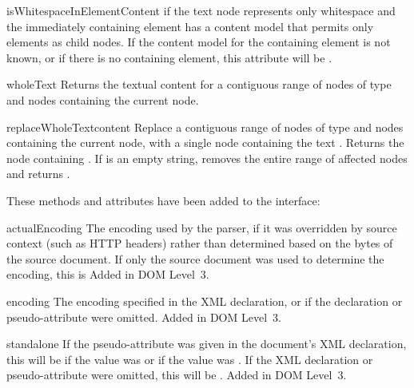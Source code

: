 \documentclass{howto}
\newcommand{\attribute}[1]{\code{#1}}
\begin{document}
\begin{memberdesc}[Text]{isWhitespaceInElementContent}
   if the text node represents only whitespace and the
  immediately containing element has a content model that permits only
  elements as child nodes.  If the content model for the containing
  element is not known, or if there is no containing element, this
  attribute will be .
\end{memberdesc}

\begin{memberdesc}[Text]{wholeText}
  Returns the textual content for a contiguous range of nodes of type
   and  nodes
  containing the current node.
\end{memberdesc}

\begin{methoddesc}[Text]{replaceWholeText}{content}
  Replace a contiguous range of nodes of type  and
   nodes containing the current node,
  with a single node containing the text .  Returns the
  node containing .  If  is an empty string,
  removes the entire range of affected nodes and returns .
\end{methoddesc}

These methods and attributes have been added to the 
interface:

\begin{memberdesc}[Document]{actualEncoding}
  The encoding used by the parser, if it was overridden by source
  context (such as HTTP headers) rather than determined based on the
  bytes of the source document.  If only the source document was used
  to determine the encoding, this is 
  Added in DOM Level~3.
\end{memberdesc}

\begin{memberdesc}[Document]{encoding}
  The encoding specified in the XML declaration, or  if the
  declaration or \attribute{encoding} pseudo-attribute were omitted.
  Added in DOM Level~3.
\end{memberdesc}

\begin{memberdesc}[Document]{standalone}
  If the \attribute{standalone} pseudo-attribute was given in the
  document's XML declaration, this will be  if the value
  was  or  if the value was .  If the
  XML declaration or \attribute{standalone} pseudo-attribute were
  omitted, this will be .
  Added in DOM Level~3.
\end{memberdesc}
\end{document}
